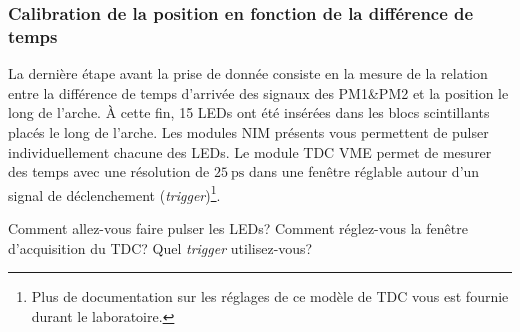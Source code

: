 \subsubsection{Calibration de la position en fonction de la différence de temps}

La dernière étape avant la prise de donnée consiste en la mesure de la relation entre la différence de temps d'arrivée des signaux des PM1\&PM2 et la position le long de l'arche.
À cette fin, 15 LEDs ont été insérées dans les blocs scintillants placés le long de l'arche.
Les modules NIM présents vous permettent de pulser individuellement chacune des LEDs.
Le module TDC VME permet de mesurer des temps avec une résolution de \(\SI{25}{\ps}\) dans une fenêtre réglable autour d'un signal de déclenchement (\textit{trigger})\footnote{Plus de documentation sur les réglages de ce modèle de TDC vous est fournie durant le laboratoire.}.

\bigskip

Comment allez-vous faire pulser les LEDs?
Comment réglez-vous la fenêtre d'acquisition du TDC?
Quel \textit{trigger} utilisez-vous?


